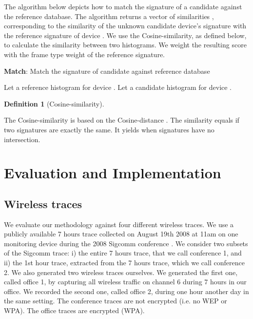 \documentclass[10pt, conference, compsocconf, letterpaper]{IEEEtran}
\newtheorem{defn}{Definition}
\begin{document}
The algorithm below depicts how to match the signature  of a candidate  against the reference database.
The algorithm returns a vector of similarities ,  corresponding 
to the similarity of the unknown candidate device's signature with the reference signature of device .
We use the Cosine-similarity, as defined below, to calculate the similarity between two histograms.
We weight the resulting score with the frame type weight  of the reference signature.


\begin{algorithm}[h!]
\begin{algorithmic}[]
{\footnotesize
\caption{{\bf Match}: Match the signature  of candidate  against reference database}
\FORALL{}
\STATE{}
\STATE{}
\ENDFOR
\ENDFOR
\RETURN{}
}
\end{algorithmic}
\label{matchalgo}
\end{algorithm}



Let  a reference histogram for device . 
Let  a  candidate histogram for device .

\begin{defn}[Cosine-similarity]

\end{defn}

The Cosine-similarity is based on the Cosine-distance \cite{Cha:MATH08}.
The similarity equals  if two signatures are exactly the same.
It yields  when signatures have no intersection.












\section{Evaluation and Implementation}
\label{sec:eval}








\subsection{Wireless traces}


We evaluate our methodology against four different wireless traces. 
We use a publicly available 7 hours trace collected on August 19th 2008 at 11am
on one monitoring device during the 2008 Sigcomm conference \cite{umd-sigcomm2008-2009-03-02}. 
We consider two subsets of the Sigcomm trace: i) the entire 7 hours trace, that we call conference 1, and ii)
the 1st hour trace, extracted from the 7 hours trace, which we call conference 2.
We also generated two wireless traces ourselves. We generated the first one, called office 1, by capturing all wireless 
traffic on channel 6 during 7 hours in our office. We recorded the second one, called office 2, during one hour another day in the same setting. 
The conference traces are not encrypted (i.e. no WEP or WPA). 
The office traces are encrypted (WPA).
\end{document}
